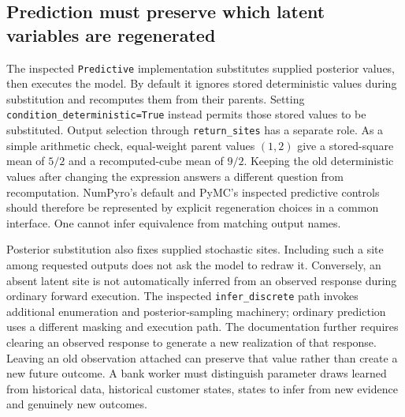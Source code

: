 \subsection{Prediction must preserve which latent variables are regenerated}

The inspected \texttt{Predictive} implementation substitutes supplied posterior values, then executes the model. By default it ignores stored deterministic values during substitution and recomputes them from their parents. Setting \texttt{condition\_deterministic=True} instead permits those stored values to be substituted. Output selection through \texttt{return\_sites} has a separate role. As a simple arithmetic check, equal-weight parent values $(1,2)$ give a stored-square mean of $5/2$ and a recomputed-cube mean of $9/2$. Keeping the old deterministic values after changing the expression answers a different question from recomputation. NumPyro's default and PyMC's inspected predictive controls should therefore be represented by explicit regeneration choices in a common interface. One cannot infer equivalence from matching output names. \citep{exec23_numpyro_sources,exec23_pymc_sources,exec23_numpyro_reference}

Posterior substitution also fixes supplied stochastic sites. Including such a site among requested outputs does not ask the model to redraw it. Conversely, an absent latent site is not automatically inferred from an observed response during ordinary forward execution. The inspected \texttt{infer\_discrete} path invokes additional enumeration and posterior-sampling machinery; ordinary prediction uses a different masking and execution path. The documentation further requires clearing an observed response to generate a new realization of that response. Leaving an old observation attached can preserve that value rather than create a new future outcome. A bank worker must distinguish parameter draws learned from historical data, historical customer states, states to infer from new evidence and genuinely new outcomes. \citep{exec23_numpyro_sources}


